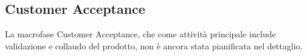 \subsection{Customer Acceptance}
La macrofase Customer Acceptance, che come attività principale include validazione e collaudo del prodotto, non è ancora stata pianificata nel dettaglio.

\newpage